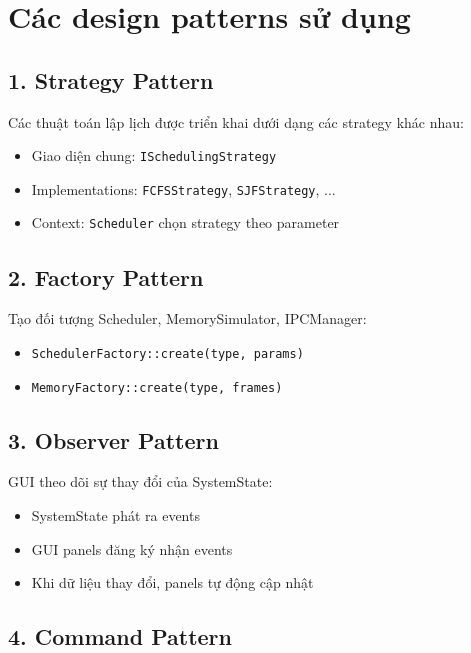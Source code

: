 \section{Các design patterns sử dụng}

\subsection{1. Strategy Pattern}

Các thuật toán lập lịch được triển khai dưới dạng các strategy khác nhau:

\begin{itemize}[leftmargin=1.5cm]
  \item Giao diện chung: \texttt{ISchedulingStrategy}
  \item Implementations: \texttt{FCFSStrategy}, \texttt{SJFStrategy}, ...
  \item Context: \texttt{Scheduler} chọn strategy theo parameter
\end{itemize}

\subsection{2. Factory Pattern}

Tạo đối tượng Scheduler, MemorySimulator, IPCManager:

\begin{itemize}[leftmargin=1.5cm]
  \item \texttt{SchedulerFactory::create(type, params)}
  \item \texttt{MemoryFactory::create(type, frames)}
\end{itemize}

\subsection{3. Observer Pattern}

GUI theo dõi sự thay đổi của SystemState:

\begin{itemize}[leftmargin=1.5cm]
  \item SystemState phát ra events
  \item GUI panels đăng ký nhận events
  \item Khi dữ liệu thay đổi, panels tự động cập nhật
\end{itemize}

\subsection{4. Command Pattern}

